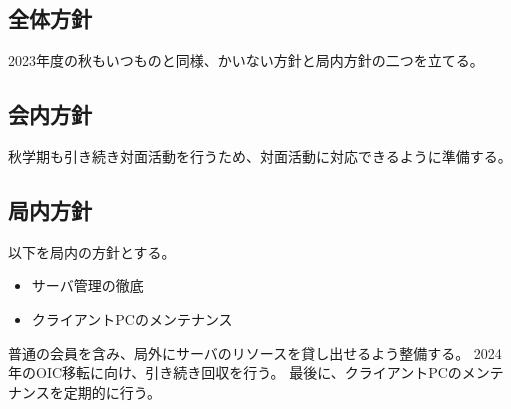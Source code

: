 \subsection*{全体方針}


2023年度の秋もいつものと同様、かいない方針と局内方針の二つを立てる。

\subsection{会内方針}
秋学期も引き続き対面活動を行うため、対面活動に対応できるように準備する。

\subsection{局内方針}
以下を局内の方針とする。
\begin{itemize}
    \item サーバ管理の徹底
    \item クライアントPCのメンテナンス
\end{itemize}
普通の会員を含み、局外にサーバのリソースを貸し出せるよう整備する。
2024年のOIC移転に向け、引き続き回収を行う。
最後に、クライアントPCのメンテナンスを定期的に行う。